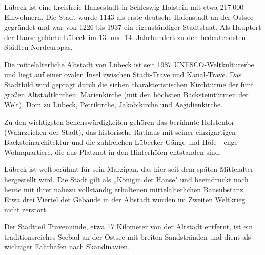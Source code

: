 \documentclass[a4paper,12pt]{article}
\begin{document}
Lübeck ist eine kreisfreie Hansestadt in Schleswig-Holstein mit etwa \mbox{217.000} Einwohnern. Die Stadt wurde 1143 als erste deutsche Hafenstadt an der Ostsee gegründet und war von 1226 bis 1937 ein eigenständiger Stadtstaat. Als Hauptort der Hanse gehörte Lübeck im 13. und 14. Jahrhundert zu den bedeutendsten Städten Nordeuropas.

Die mittelalterliche Altstadt von Lübeck ist seit 1987 UNESCO-Weltkulturerbe und liegt auf einer ovalen Insel zwischen Stadt-Trave und Kanal-Trave. Das Stadtbild wird geprägt durch die sieben charakteristischen Kirchtürme der fünf großen Altstadtkirchen: Marienkirche (mit den höchsten Backsteintürmen der Welt), Dom zu Lübeck, Petrikirche, Jakobikirche und Aegidienkirche.

Zu den wichtigsten Sehenswürdigkeiten gehören das berühmte Holstentor (Wahrzeichen der Stadt), das historische Rathaus mit seiner einzigartigen Backsteinarchitektur und die zahlreichen Lübecker Gänge und Höfe - enge Wohnquartiere, die aus Platznot in den Hinterhöfen entstanden sind.

Lübeck ist weltberühmt für sein Marzipan, das hier seit dem späten Mittelalter hergestellt wird. Die Stadt gilt als „Königin der Hanse" und beeindruckt noch heute mit ihrer nahezu vollständig erhaltenen mittelalterlichen Bausubstanz. Etwa drei Viertel der Gebäude in der Altstadt wurden im Zweiten Weltkrieg nicht zerstört.

Der Stadtteil Travemünde, etwa 17 Kilometer von der Altstadt entfernt, ist ein traditionsreiches Seebad an der Ostsee mit breiten Sandstränden und dient als wichtiger Fährhafen nach Skandinavien.
\end{document}
